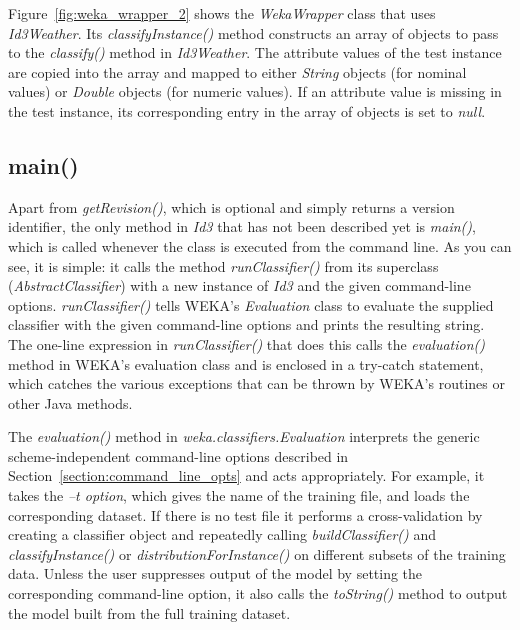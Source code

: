 Figure~\ref{fig:weka_wrapper_2} shows the \textit{WekaWrapper} class
that uses \textit{Id3Weather}. Its \textit{classifyInstance()} method
constructs an array of objects to pass to
the \textit{classify()} method in \textit{Id3Weather}. The attribute
values of the test instance are copied into the array and mapped to
either \textit{String} objects (for nominal values) or \textit{Double}
objects (for numeric values). If an attribute value is missing in the
test instance, its corresponding entry in the array of objects is set
to \textit{null}.

\subsection{main()}

Apart from \textit{getRevision()}, which is optional and simply returns a
version identifier, the only method in \textit{Id3} that has not been described yet
is \textit{main()}, which is called whenever the class is executed from the
command line. As you can see, it is simple: it calls the method
\textit{runClassifier()} from its superclass (\textit{AbstractClassifier}) with a new instance
of {\em Id3} and the given command-line options. \textit{runClassifier()} tells
WEKA's \textit{Evaluation} class to evaluate the supplied classifier with the
given command-line options and prints the resulting string. The
one-line expression in \textit{runClassifier()} that does this calls the
\textit{evaluation()} method in WEKA's evaluation class and is enclosed in a
try-catch statement, which catches the various exceptions that can be
thrown by WEKA's routines or other Java methods.

The \textit{evaluation()} method
in \textit{weka.classifiers.Evaluation} interprets the generic
scheme-independent command-line options described in
Section~\ref{section:command_line_opts} and acts appropriately. For
example, it takes the \textit{--t option}, which gives the name of the training
file, and loads the corresponding dataset. If there is no test file it
performs a cross-validation by creating a classifier object and
repeatedly calling \textit{buildClassifier()} and \textit{classifyInstance()} or
\textit{distributionForInstance()} on different subsets of the training
data. Unless the user suppresses output of the model by setting the
corresponding command-line option, it also calls
the \textit{toString()} method to output the model built from the full
training dataset.

